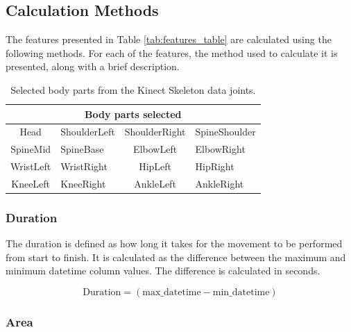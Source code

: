         \subsection{Calculation Methods}

            The features presented in Table \ref{tab:features_table} are calculated using the following methods. For each of the features, the method used to calculate it is presented, along with a brief description.

            \begin{table}[ht]
                \centering
                \begin{tabular}{@{}clcl@{}}
                    \toprule
                    \multicolumn{4}{c}{\textbf{Body parts selected}} \\
                    \midrule
                     Head & ShoulderLeft & ShoulderRight & SpineShoulder \\
                     SpineMid & SpineBase & ElbowLeft & ElbowRight \\
                     WristLeft & WristRight & HipLeft & HipRight \\
                     KneeLeft & KneeRight & AnkleLeft & AnkleRight \\
                    \bottomrule
                \end{tabular}
                \caption{Selected body parts from the Kinect Skeleton data joints.}
                \label{tab:body_parts_table}
            \end{table} 

            \subsubsection{Duration}

                The duration is defined as how long it takes for the movement to be performed from start to finish. It is calculated as the difference between the maximum and minimum datetime column values. The difference is calculated in seconds.

                \begin{equation}\label{eq:duration}
                    \text{Duration} = (\text{{max\_datetime}} - \text{{min\_datetime}})
                \end{equation}
            
            \subsubsection{Area}

